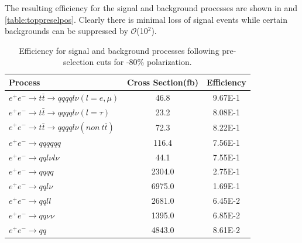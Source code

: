 The resulting efficiency for the signal and background processes are shown in  and \ref{table:toppreselpos}. Clearly there is minimal loss of signal events while certain backgrounds can be suppressed by $\mathcal{O}$(10$^2$).

\begin{table}
  \centering
  \begin{tabular}{l | c | c }
    \toprule
    Process     & Cross Section(fb) & Efficiency  \\
     \midrule
     $e^+e^-\rightarrow t\bar{t} \rightarrow qqqql\nu (l=e,\mu)$& 46.8 & 9.67E-1 \\
    \midrule
    $e^+e^-\rightarrow t\bar{t} \rightarrow qqqql\nu (l=\tau)$& 23.2 & 8.08E-1 \\
    \midrule
    $e^+e^-\rightarrow t\bar{t} \rightarrow qqqql\nu (non ~ t\bar{t})$& 72.3 & 8.22E-1\\
    \midrule
    $e^+e^-\rightarrow qqqqqq$ & 116.4 &  7.56E-1\\
    \midrule
    $e^+e^-\rightarrow qql\nu l\nu$ & 44.1 &  7.55E-1\\
    \midrule
    $e^+e^-\rightarrow qqqq$ & 2304.0 &  2.75E-1\\
    \midrule
    $e^+e^-\rightarrow qql\nu$ & 6975.0 &  1.69E-1\\
    \midrule
    $e^+e^-\rightarrow qqll$ & 2681.0 &  6.45E-2\\
    \midrule
    $e^+e^-\rightarrow qq\nu\nu$ & 1395.0 &  6.85E-2\\
    \midrule
    $e^+e^-\rightarrow qq$ & 4843.0 & 8.61E-2\\
    \bottomrule
  \end{tabular}
  \caption{Efficiency for signal and background processes following pre-selection cuts for -80\% polarization.}
  \label{table:toppreselneg}
\end{table}

